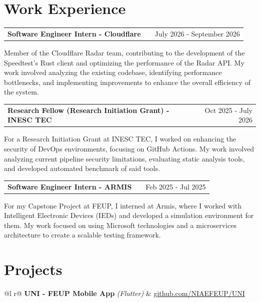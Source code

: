 \documentclass[a4paper,11pt]{article}
\makeatletter
\newenvironment{jobshort}[2]
    {
    \begin{tabularx}{\linewidth}{@{}l X r@{}}
    \textbf{#1} & \hfill &  #2 \\[3.75pt]
    \end{tabularx}
    }
    {
    }
\makeatother
\begin{document}
\section{Work Experience}

\begin{jobshort}{Software Engineer Intern - Cloudflare}{July 2026 - September 2026}
Member of the Cloudflare Radar team, contributing to the development of the Speedtest's Rust client and optimizing the performance of the Radar API. My work involved analyzing the existing codebase, identifying performance bottlenecks, and implementing improvements to enhance the overall efficiency of the system.
\end{jobshort}

\begin{jobshort}{Research Fellow (Research Initiation Grant) - INESC TEC}{Oct 2025 - July 2026}
For a Research Initiation Grant at INESC TEC, I worked on enhancing the security of DevOps environments, focusing on GitHub Actions. My work involved analyzing current pipeline security limitations, evaluating static analysis tools, and developed automated benchmark of said tools.
\end{jobshort}

\begin{jobshort}{Software Engineer  Intern - ARMIS}{Feb 2025 - Jul 2025}
For my Capstone Project at FEUP, I interned at Armis, where I worked with Intelligent Electronic Devices (IEDs) and developed a simulation environment for them. My work focused on using Microsoft technologies and a microservices architecture to create a scalable testing framework.
\end{jobshort}

\section{Projects}

\begin{tabularx}{\linewidth}{ @{}l r@{} }
\textbf{UNI - FEUP Mobile App} \textit{(Flutter)} & \hfill \href{https://github.com/NIAEFEUP/uni}{github.com/NIAEFEUP/UNI} \\[3.75pt]
  \\
\end{tabularx}
\end{document}
